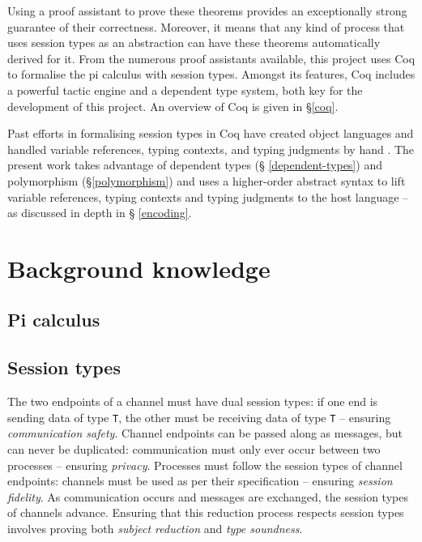 \documentclass{mproj}
\begin{document}
Using a proof assistant to prove these theorems provides an exceptionally strong
guarantee of their correctness. Moreover, it means that any kind of process that
uses session types as an abstraction can have these theorems automatically
derived for it. From the numerous proof assistants available, this project uses
Coq to formalise the pi calculus with session types. Amongst its features, Coq
includes a powerful tactic engine and a dependent type system, both key for the
development of this project. An overview of Coq is given in \S \ref{coq}.

Past efforts in formalising session types in Coq have created object languages
and handled variable references, typing contexts, and typing judgments by hand
\cite{Dilmore2019}. The present work takes advantage of dependent types (\S
\ref{dependent-types}) and polymorphism (\S \ref{polymorphism}) and uses a
higher-order abstract syntax to lift variable references, typing contexts and
typing judgments to the host language -- as discussed in depth in \S
\ref{encoding}.


\chapter{Background knowledge}

\section{Pi calculus}\label{pi-calculus}


\section{Session types}\label{session-types}


The two endpoints of a channel must have dual session types: if one end is
sending data of type \texttt{T}, the other must be receiving data of type
\texttt{T} -- ensuring \textit{communication safety}. Channel endpoints can be
passed along as messages, but can never be duplicated: communication must only
ever occur between two processes -- ensuring \textit{privacy}.  Processes must
follow the session types of channel endpoints: channels must be used as per
their specification -- ensuring \textit{session fidelity}. As communication
occurs and messages are exchanged, the session types of channels advance.
Ensuring that this reduction process respects session types involves proving
both \textit{subject reduction} and \textit{type soundness}. \cite{Dardha2016m}
\end{document}
